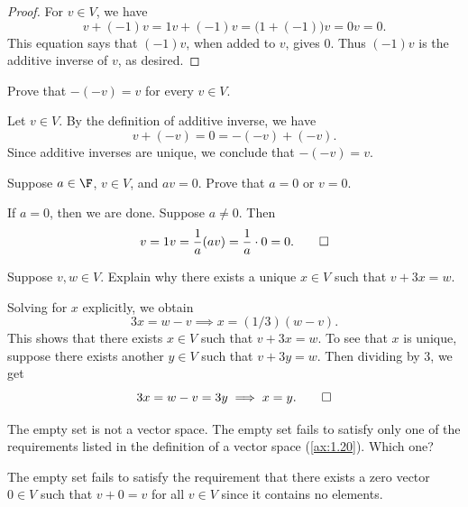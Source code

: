 \begin{proof}
For $v\in V$, we have
\[ v+(-1)v = 1v+(-1)v = \bigl(1+(-1)\bigr)v = 0v = 0. \]
This equation says that $(-1)v$, when added to $v$, gives $0$. Thus $(-1)v$ is
the additive inverse of $v$, as desired.
\end{proof}


\begin{exercise}
Prove that $-(-v)=v$ for every $v\in V$.
\end{exercise}
\begin{solution}
Let $v\in V$. By the definition of additive inverse, we have
\[ v+(-v) = 0 = -(-v)+(-v). \]
Since additive inverses are unique, we conclude that $-(-v)=v$.
\end{solution}

\begin{exercise}
Suppose $a\in\F$, $v\in V$, and $av=0$. Prove that $a=0$ or $v=0$.
\end{exercise}
\begin{solution}
If $a=0$, then we are done. Suppose $a\ne0$. Then
\[ v = 1v = \frac1a(av) = \frac1a\cdot0 = 0. \qedhere \]
\end{solution}

\begin{exercise}
Suppose $v,w\in V$. Explain why there exists a unique $x\in V$ such that
$v+3x=w$.
\end{exercise}
\begin{solution}
Solving for $x$ explicitly, we obtain
\[ 3x = w-v \implies x = (1/3)(w-v). \]
This shows that there exists $x\in V$ such that $v+3x=w$. To see that $x$ is
unique, suppose there exists another $y\in V$ such that $v+3y=w$. Then dividing
by $3$, we get
\[ 3x = w-v = 3y \implies x = y. \qedhere \]
\end{solution}

\begin{exercise}
The empty set is not a vector space. The empty set fails to satisfy only one of
the requirements listed in the definition of a vector space (\ref{ax:1.20}).
Which one?
\end{exercise}
\begin{solution}
The empty set fails to satisfy the requirement that there exists a zero vector
$0\in V$ such that $v+0=v$ for all $v\in V$ since it contains no elements.
\end{solution}

